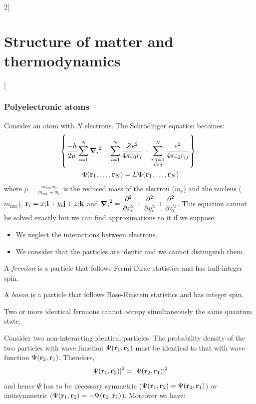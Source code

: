 \documentclass[../../../main.tex]{subfiles}
\begin{document}
\begin{multicols}{2}[\section{Structure of matter and thermodynamics}]
  \subsubsection*{Polyelectronic atoms}
  \begin{prop}
    Consider an atom with $N$ electrons. The Schrödinger equation becomes:
    \begin{multline*}
      \left\{\frac{-\hbar}{2\mu}\sum_{i=1}^N{\grad_i}^2-\sum_{i=1}^N\frac{Ze^2}{4\pi\varepsilon_0r_i}+\sum_{\substack{i,j=1\\i>j}}^N\frac{e^2}{4\pi\varepsilon_0r_{ij}}\right\}\cdot\\\cdot\Phi(\vb{r}_1,\ldots,\vb{r}_N)=E\Phi(\vb{r}_1,\ldots,\vb{r}_N)
    \end{multline*}
    where $\displaystyle\mu=\frac{m_\text{nuc}m_e}{m_\text{nuc}+m_e}$ is the reduced mass of the electron ($m_e$) and the nucleus ($m_\text{nuc}$), $\vb{r}_i=x_i\vb{i}+y_i\vb{j}+z_i\vb{k}$ and $\displaystyle{\grad_i}^2=\pdv[2]{}{x_i}+\pdv[2]{}{y_i}+\pdv[2]{}{z_i}$.
    This equation cannot be solved exactly but we can find approximations to it if we suppose:
    \begin{itemize}
      \item We neglect the interactions between electrons.
      \item We consider that the particles are identic and we cannot distinguish them.
    \end{itemize}
  \end{prop}
  \begin{definition}[Fermions]
    A \textit{fermion} is a particle that follows Fermi-Dirac statistics and has half integer spin.
  \end{definition}
  \begin{definition}[Boson]
    A \textit{boson} is a particle that follows Bose-Einstein statistics and has integer spin.
  \end{definition}
  \begin{prop}
    Two or more identical fermions cannot occupy simultaneously the same quantum state.
  \end{prop}
  \begin{prop}
    Consider two non-interacting identical particles. The probability density of the two particles with wave function $\Psi(\vb{r}_1,\vb{r}_2)$ must be identical to that with wave function $\Psi(\vb{r}_2,\vb{r}_1)$. Therefore, $${|\Psi(\vb{r}_1,\vb{r}_2)|}^2={|\Psi(\vb{r}_2,\vb{r}_1)|}^2$$ and hence $\Psi$ has to be necessary symmetric ($\Psi(\vb{r}_1,\vb{r}_2)=\Psi(\vb{r}_2,\vb{r}_1)$) or antisymmetric ($\Psi(\vb{r}_1,\vb{r}_2)=-\Psi(\vb{r}_2,\vb{r}_1)$). Moreover we have:

\end{prop}
\end{multicols}
\end{document}
